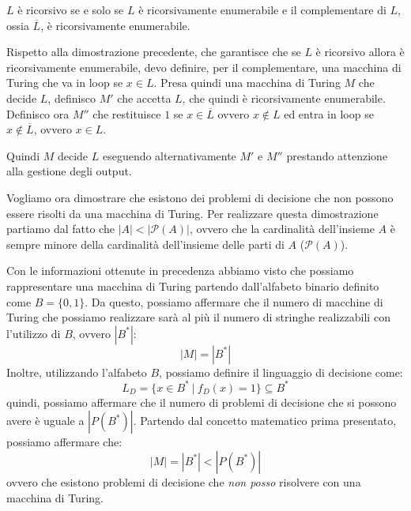 \begin{teorema} \label{teo-rec-en-comp}
    $L$ è ricorsivo se e solo se $L$ è ricorsivamente enumerabile e il
    complementare di $L$, ossia $\overline{L}$, è ricorsivamente enumerabile.
\end{teorema}
\begin{dimostrazione}
    Rispetto alla dimostrazione precedente, che garantisce che se $L$ è ricorsivo
    allora è ricorsivamente enumerabile, devo definire, per il complementare,
    una macchina di Turing che va in loop se $x \in L$. Presa quindi una macchina
    di Turing $M$ che decide $L$, definisco $M'$ che accetta $L$, che quindi è
    ricorsivamente enumerabile. Definisco ora $M''$ che restituisce $1$ se
    $x \in \overline{L}$ ovvero $x \not\in L$ ed entra in loop se $x \not\in
        \overline{L}$, ovvero $x \in L$.

    Quindi $M$ decide $L$ eseguendo alternativamente $M'$ e $M''$ prestando
    attenzione alla gestione degli output.
\end{dimostrazione}
Vogliamo ora dimostrare che esistono dei problemi di decisione che non possono
essere risolti da una macchina di Turing. Per realizzare questa dimostrazione
partiamo dal fatto che $|A| < |\mathcal{P}(A)|$, ovvero che la cardinalità
dell'insieme $A$ è sempre minore della cardinalità dell'insieme delle parti di
$A$ ($\mathcal{P}(A)$).

Con le informazioni ottenute in precedenza abbiamo visto che possiamo
rappresentare una macchina di Turing partendo dall'alfabeto binario definito
come $B = \{0, 1\}$. Da questo, possiamo affermare che il numero di macchine di
Turing che possiamo realizzare sarà al più il numero di stringhe realizzabili
con l'utilizzo di $B$, ovvero $|B^{\ast}|$:
\begin{equation}
    |M| = |B^{\ast}|
\end{equation}
Inoltre, utilizzando l'alfabeto $B$, possiamo definire il linguaggio di
decisione come:
\begin{equation}
    L_D = \{x \in B^{\ast} \ | \ f_D(x) = 1\} \subseteq B^{\ast}
\end{equation}
quindi, possiamo affermare che il numero di problemi di decisione che si possono
avere è uguale a $|P(B^{\ast})|$. Partendo dal concetto matematico prima
presentato, possiamo affermare che:
\begin{equation}
    |M| = |B^{\ast}| < |P(B^{\ast})|
\end{equation}
ovvero che esistono problemi di decisione che \textit{non posso} risolvere con
una macchina di Turing.
